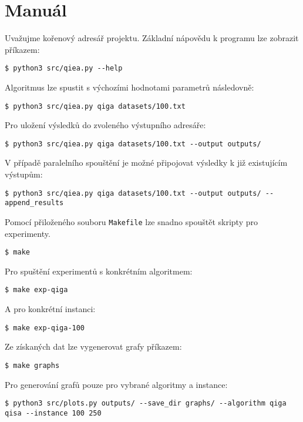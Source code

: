 \chapter{Manuál}
Uvažujme kořenový adresář projektu. Základní nápovědu k programu lze zobrazit příkazem:
\begin{lstlisting}[style=bash]
    $ python3 src/qiea.py --help
\end{lstlisting}
Algoritmus lze spustit s výchozími hodnotami parametrů následovně:
\begin{lstlisting}[style=bash]
    $ python3 src/qiea.py qiga datasets/100.txt
\end{lstlisting}
Pro uložení výsledků do zvoleného výstupního adresáře:
\begin{lstlisting}[style=bash]
    $ python3 src/qiea.py qiga datasets/100.txt --output outputs/
\end{lstlisting}
V případě paralelního spouštění je možné připojovat výsledky k již existujícím výstupům:
\begin{lstlisting}[style=bash]
    $ python3 src/qiea.py qiga datasets/100.txt --output outputs/ --append_results
\end{lstlisting}
Pomocí přiloženého souboru \texttt{Makefile} lze snadno spouštět skripty pro experimenty.
\begin{lstlisting}[style=bash]
    $ make
\end{lstlisting}
Pro spuštění experimentů s konkrétním algoritmem:
\begin{lstlisting}[style=bash]
    $ make exp-qiga
\end{lstlisting}
A pro konkrétní instanci:
\begin{lstlisting}[style=bash]
    $ make exp-qiga-100
\end{lstlisting}
Ze získaných dat lze vygenerovat grafy příkazem:
\begin{lstlisting}[style=bash]
    $ make graphs
\end{lstlisting}
Pro generování grafů pouze pro vybrané algoritmy a instance:
\begin{lstlisting}[style=bash]
    $ python3 src/plots.py outputs/ --save_dir graphs/ --algorithm qiga qisa --instance 100 250
\end{lstlisting}


